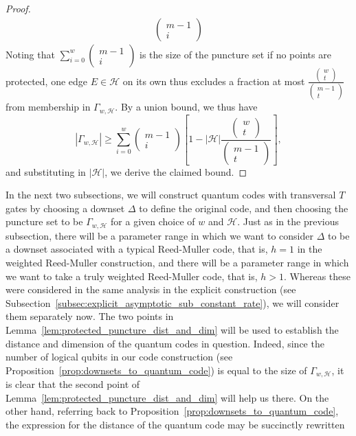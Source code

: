 \documentclass{article}
\begin{document}
\begin{proof}
\begin{align}
\begin{pmatrix}
            m-1\\i
        \end{pmatrix}
    \end{align}
    Noting that $\sum_{i=0}^w\left(\begin{smallmatrix}m-1\\i\end{smallmatrix}\right)$ is the size of the puncture set if no points are protected, one edge $E \in \mathcal{H}$ on its own thus excludes a fraction at most $\frac{\left(\begin{smallmatrix}w\\t\end{smallmatrix}\right)}{\left(\begin{smallmatrix}m-1\\t\end{smallmatrix}\right)}$ from membership in $\Gamma_{w,\mathcal{H}}$. By a union bound, we thus have
    \begin{equation}
        |\Gamma_{w,\mathcal{H}}| \geq \sum_{i=0}^w\begin{pmatrix}
            m-1\\i
        \end{pmatrix}\left[1-|\mathcal{H}|\frac{\begin{pmatrix}
            w\\t
        \end{pmatrix}}{\begin{pmatrix}
            m-1\\t
        \end{pmatrix}}\right],
    \end{equation}
    and substituting in $|\mathcal{H}|$, we derive the claimed bound.
\end{proof}
In the next two subsections, we will construct quantum codes with transversal $T$ gates by choosing a downset $\Delta$ to define the original code, and then choosing the puncture set to be $\Gamma_{w,\mathcal{H}}$ for a given choice of $w$ and $\mathcal{H}$. Just as in the previous subsection, there will be a parameter range in which we want to consider $\Delta$ to be a downset associated with a typical Reed-Muller code, that is, $h=1$ in the weighted Reed-Muller construction, and there will be a parameter range in which we want to take a truly weighted Reed-Muller code, that is, $h>1$. Whereas these were considered in the same analysis in the explicit construction (see Subsection~\ref{subsec:explicit_asymptotic_sub_constant_rate}), we will consider them separately now. The two points in Lemma~\ref{lem:protected_puncture_dist_and_dim} will be used to establish the distance and dimension of the quantum codes in question. Indeed, since the number of logical qubits in our code construction (see Proposition~\ref{prop:downsets_to_quantum_code}) is equal to the size of $\Gamma_{w,\mathcal{H}}$, it is clear that the second point of Lemma~\ref{lem:protected_puncture_dist_and_dim} will help us there. On the other hand, referring back to Proposition~\ref{prop:downsets_to_quantum_code}, the expression for the distance of the quantum code may be succinctly rewritten
\end{document}
